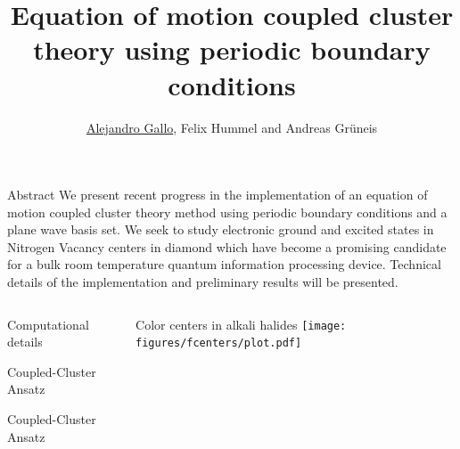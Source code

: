 \documentclass[final]{beamer}
\title{
  Equation of motion coupled cluster theory using periodic boundary conditions
}
\author{\underline{Alejandro Gallo}, Felix Hummel and Andreas Gr\"uneis}
\institute[]{
  Technical University of Vienna
}
\begin{document}
\nocite{*}
\begin{frame}[fragile]{}

  \begin{block}{\large Abstract}
    We present recent progress in the implementation of an equation of motion
    coupled cluster theory method using periodic boundary conditions and a plane
    wave basis set.  We seek to study electronic ground and excited states in
    Nitrogen Vacancy centers in diamond which have become a promising candidate
    for a bulk room temperature quantum information processing device. Technical
    details of the implementation and preliminary results will be presented.
  \end{block}
  \begin{columns}[t]
    \begin{column}{.49\linewidth}
      \begin{block}{\large Computational details}
        
      \end{block}
      \begin{block}{\large Coupled-Cluster Ansatz}
        
      \end{block}
      \begin{block}{\large Coupled-Cluster Ansatz}
        
      \end{block}
    \end{column}


    \begin{column}{.49\linewidth}

      \begin{block}{\large Color centers in alkali halides}
        \texttt{[image: figures/fcenters/plot.pdf]}
      \end{block}


\end{column}
\end{columns}
\end{frame}
\end{document}
